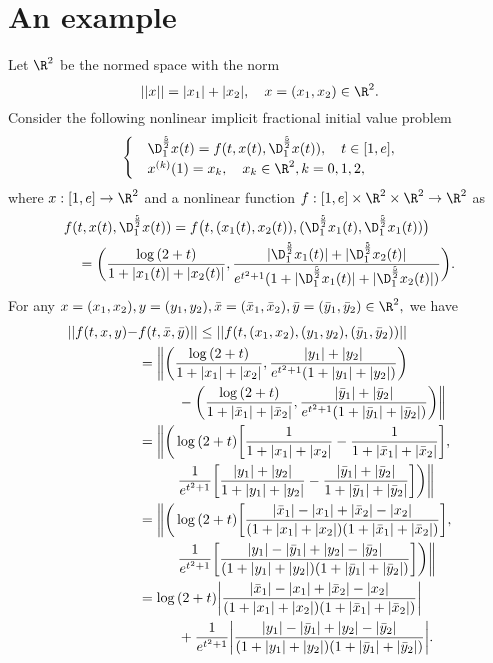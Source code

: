 \section{An example}
Let ${\R}^{2}$ be the normed space with the norm
\begin{equation*}
||x||=|x_1|+|x_2|, \quad x=(x_1,x_2)\in{\R}^{2}.
\end{equation*}
Consider the following nonlinear implicit fractional initial value problem
\begin{equation}\label{e1}
\begin{cases}
&\D_{1}^{\frac{5}{2}}x(t)=f(t,x(t),{\D_{1}^{\frac{5}{2}}x(t)}),\quad t\in[1,e],\\
&x^{(k)}(1)=x_k,\quad x_k\in{\R}^{2}, k=0,1,2,
\end{cases}
\end{equation}
where $x:[1,e]\to{\R}^{2}$ and a nonlinear function $f:[1,e]\times{\R}^{2}\times{\R}^{2}\to{\R}^{2}$ as
\begin{align*}
f(&t,x(t),{\D_{1}^{\frac{5}{2}}x(t)})=f\big(t,(x_1(t),x_2(t)),({\D_{1}^{\frac{5}{2}}x_1(t)},{\D_{1}^{\frac{5}{2}}x_1(t)})\big)\\
&=\bigg(\frac{\log{(2+t)}}{1+|x_1(t)|+|x_2(t)|},\frac{|{\D_{1}^{\frac{5}{2}}x_1(t)}|+|{\D_{1}^{\frac{5}{2}}x_2(t)}|}{e^{t^2+1}(1+|{\D_{1}^{\frac{5}{2}}x_1(t)}|+|{\D_{1}^{\frac{5}{2}}x_2(t)}|)}\bigg).
\end{align*}
For any $x=(x_1,x_2),y=(y_1,y_2),\bar{x}=(\bar{x}_1,\bar{x}_2),\bar{y}=(\bar{y}_1,\bar{y}_2)\in{\R}^2,$ we have
\begin{align*}
||f(t,x,y)-&f(t,\bar{x},\bar{y})||\leq||f(t,(x_1,x_2),(y_1,y_2),(\bar{y}_1,\bar{y}_2))||\\
&=\bigg{\|}\bigg(\frac{\log{(2+t)}}{1+|x_1|+|x_2|},\frac{|y_1|+|y_2|}{e^{t^2+1}(1+|y_1|+|y_2|)}\bigg)\\
&\hspace{1cm}-\bigg(\frac{\log{(2+t)}}{1+|\bar{x}_1|+|\bar{x}_2|},\frac{|\bar{y}_1|+|\bar{y}_2|}{e^{t^2+1}(1+|\bar{y}_1|+|\bar{y}_2|)}\bigg)\bigg{\|}\\
&=\bigg{\|}\bigg(\log{(2+t)}\bigg[\frac{1}{1+|x_1|+|x_2|}-\frac{1}{1+|\bar{x}_1|+|\bar{x}_2|}\bigg],\\
&\hspace{1cm}\frac{1}{e^{t^2+1}}\bigg[\frac{|y_1|+|y_2|}{1+|y_1|+|y_2|}-\frac{|\bar{y}_1|+|\bar{y}_2|}{1+|\bar{y}_1|+|\bar{y}_2|}\bigg]\bigg)\bigg{\|}\\
&=\bigg{\|}\bigg(\log{(2+t)}\bigg[\frac{|\bar{x}_1|-|x_1|+|\bar{x}_2|-|x_2|}{(1+|x_1|+|x_2|)(1+|\bar{x}_1|+|\bar{x}_2|)}\bigg],\\
&\hspace{1cm}\frac{1}{e^{t^2+1}}\bigg[\frac{|y_1|-|\bar{y}_1|+|y_2|-|\bar{y}_2|}{(1+|y_1|+|y_2|)(1+|\bar{y}_1|+|\bar{y}_2|)}\bigg]\bigg)\bigg{\|}\\
&=\log{(2+t)}\bigg|\frac{|\bar{x}_1|-|x_1|+|\bar{x}_2|-|x_2|}{(1+|x_1|+|x_2|)(1+|\bar{x}_1|+|\bar{x}_2|)}\bigg|\\
&\hspace{1cm}+\frac{1}{e^{t^2+1}}\bigg|\frac{|y_1|-|\bar{y}_1|+|y_2|-|\bar{y}_2|}{(1+|y_1|+|y_2|)(1+|\bar{y}_1|+|\bar{y}_2|)}\bigg|.
\end{align*}
